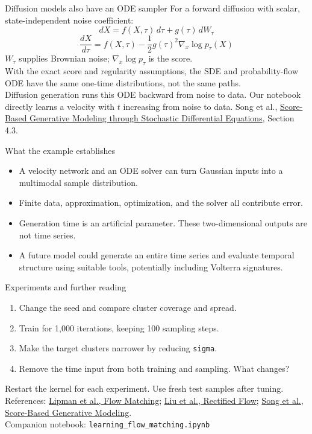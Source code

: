 \documentclass[aspectratio=169,11pt]{beamer}
\begin{document}
\begin{frame}{Diffusion models also have an ODE sampler}
\small For a forward diffusion with scalar, state-independent noise coefficient:
\normalsize
\[dX=f(X,\tau)\,d\tau+g(\tau)\,dW_\tau\]
\[\frac{dX}{d\tau}=f(X,\tau)-\frac12g(\tau)^2\nabla_x\log p_\tau(X)\]
\small
$W_\tau$ supplies Brownian noise; $\nabla_x\log p_\tau$ is the score.\\[3mm]
With the exact score and regularity assumptions, the SDE and probability-flow ODE have the same one-time distributions, not the same paths.\\[3mm]
Diffusion generation runs this ODE backward from noise to data. Our notebook directly learns a velocity with $t$ increasing from noise to data.
\vfill{\tiny\color{gray}Song et al., \href{https://arxiv.org/abs/2011.13456}{Score-Based Generative Modeling through Stochastic Differential Equations}, Section 4.3.}
\end{frame}

\begin{frame}{What the example establishes}
\begin{itemize}\setlength\itemsep{4mm}
\item A velocity network and an ODE solver can turn Gaussian inputs into a multimodal sample distribution.
\item Finite data, approximation, optimization, and the solver all contribute error.
\item Generation time is an artificial parameter. These two-dimensional outputs are not time series.
\item A future model could generate an entire time series and evaluate temporal structure using suitable tools, potentially including Volterra signatures.
\end{itemize}
\end{frame}

\begin{frame}{Experiments and further reading}
\begin{enumerate}\setlength\itemsep{3mm}
\item Change the seed and compare cluster coverage and spread.
\item Train for 1,000 iterations, keeping 100 sampling steps.
\item Make the target clusters narrower by reducing \texttt{sigma}.
\item Remove the time input from both training and sampling. What changes?
\end{enumerate}
\vspace{3mm}
Restart the kernel for each experiment. Use fresh test samples after tuning.
\vfill
\tiny References: \href{https://arxiv.org/abs/2210.02747}{Lipman et al., Flow Matching};
\href{https://arxiv.org/abs/2209.03003}{Liu et al., Rectified Flow};
\href{https://arxiv.org/abs/2011.13456}{Song et al., Score-Based Generative Modeling}.\\[3mm]
\small Companion notebook: \texttt{learning\_flow\_matching.ipynb}
\end{frame}
\end{document}
